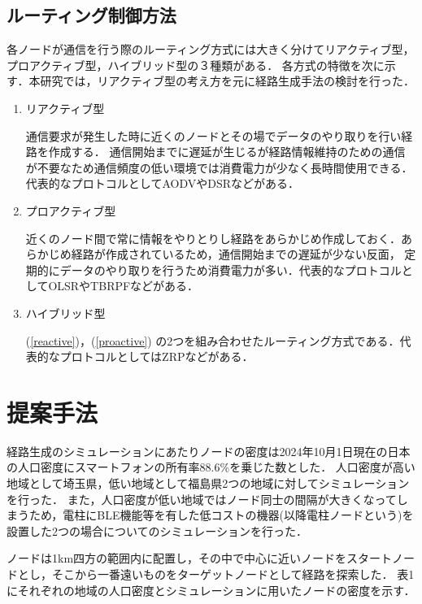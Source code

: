 \documentclass[a4paper, 9pt]{ltjsarticle}
\begin{document}
\subsection{ルーティング制御方法} \label{sublabel:routing control}
各ノードが通信を行う際のルーティング方式には大きく分けてリアクティブ型，プロアクティブ型，ハイブリッド型の３種類がある．
各方式の特徴を次に示す．本研究では，リアクティブ型の考え方を元に経路生成手法の検討を行った．
\begin{enumerate}
  \item \label{reactive} リアクティブ型 \par  
  \indent 通信要求が発生した時に近くのノードとその場でデータのやり取りを行い経路を作成する．
  通信開始までに遅延が生じるが経路情報維持のための通信が不要なため通信頻度の低い環境では消費電力が少なく長時間使用できる．
  代表的なプロトコルとしてAODVやDSRなどがある．

  \item \label{proactive} プロアクティブ型 \par
  \indent 近くのノード間で常に情報をやりとりし経路をあらかじめ作成しておく．あらかじめ経路が作成されているため，通信開始までの遅延が少ない反面，
  定期的にデータのやり取りを行うため消費電力が多い．代表的なプロトコルとしてOLSRやTBRPFなどがある．

  \item ハイブリッド型 \par
  \indent (\ref{reactive})，(\ref{proactive}) の2つを組み合わせたルーティング方式である．代表的なプロトコルとしてはZRPなどがある．
\end{enumerate}

\section{提案手法} \label{label:proposed method}
経路生成のシミュレーションにあたりノードの密度は2024年10月1日現在の日本の人口密度\cite{人口密度}にスマートフォンの所有率88.6\%\cite{スマホ保有率}を乗じた数とした．%
人口密度が高い地域として埼玉県，低い地域として福島県2つの地域に対してシミュレーションを行った．
また，人口密度が低い地域ではノード同士の間隔が大きくなってしまうため，電柱にBLE機能等を有した低コストの機器(以降電柱ノードという)を設置した2つの場合についてのシミュレーションを行った．\par
ノードは1km四方の範囲内に配置し，その中で中心に近いノードをスタートノードとし，そこから一番遠いものをターゲットノードとして経路を探索した．
表1にそれぞれの地域の人口密度とシミュレーションに用いたノードの密度を示す．
\end{document}
